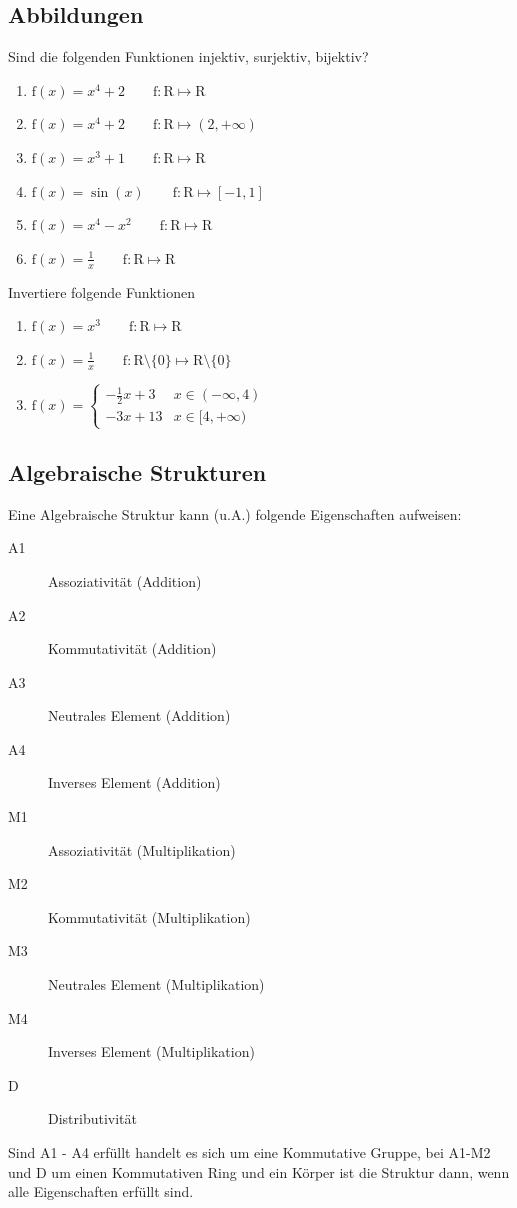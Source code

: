 \documentclass[11pt, a4paper]{article}
\begin{document}
\subsection{Abbildungen}
Sind die folgenden Funktionen injektiv, surjektiv, bijektiv?
\begin{enumerate}
	\item $\mathrm{f}(x) = x^4+2 \qquad \mathrm{f}: \mathrm{R} \mapsto \mathrm{R}$
	\item $\mathrm{f}(x) = x^4+2 \qquad \mathrm{f}: \mathrm{R} \mapsto (2, + \infty)$
	\item $\mathrm{f}(x) = x^3+1 \qquad \mathrm{f}: \mathrm{R} \mapsto \mathrm{R}$
	\item $\mathrm{f}(x) = \sin(x) \qquad \mathrm{f}: \mathrm{R} \mapsto [-1, 1]$
	\item $\mathrm{f}(x) = x^4 - x^2 \qquad \mathrm{f}: \mathrm{R} \mapsto \mathrm{R}$
	\item $\mathrm{f}(x) = \frac{1}{x} \qquad \mathrm{f}: \mathrm{R} \mapsto \mathrm{R}$
\end{enumerate}
Invertiere folgende Funktionen
\begin{enumerate}
	\item $\mathrm{f}(x) = x^3 \qquad \mathrm{f}: \mathrm{R} \mapsto \mathrm{R}$
	\item $\mathrm{f}(x) = \frac{1}{x} \qquad \mathrm{f}: \mathrm{R} \setminus \{0\} \mapsto \mathrm{R} \setminus \{0\}$
	\item $\mathrm{f}(x) =
		\begin{cases}
			- \frac{1}{2}x + 3 & x \in (-\infty, 4) \\
			- 3x + 13 & x \in [4, +\infty)
		\end{cases}
		$
\end{enumerate}

\subsection{Algebraische Strukturen}
Eine Algebraische Struktur kann (u.A.) folgende Eigenschaften aufweisen:
\begin{description}
	\item[A1] Assoziativität (Addition)
	\item[A2] Kommutativität (Addition)
	\item[A3] Neutrales Element (Addition)
	\item[A4] Inverses Element (Addition)
	\item[M1] Assoziativität (Multiplikation)
	\item[M2] Kommutativität (Multiplikation)
	\item[M3] Neutrales Element (Multiplikation)
	\item[M4] Inverses Element (Multiplikation)
	\item[D] Distributivität
\end{description}
Sind A1 - A4 erfüllt handelt es sich um eine Kommutative Gruppe, bei A1-M2 und D um einen Kommutativen Ring und ein Körper ist die Struktur dann, wenn alle Eigenschaften erfüllt sind.
\end{document}
